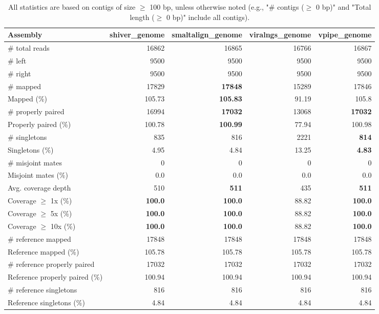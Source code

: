 \documentclass[12pt,a4paper]{article}
\begin{document}
\begin{table}[ht]
\begin{center}
\caption{All statistics are based on contigs of size $\geq$ 100 bp, unless otherwise noted (e.g., "\# contigs ($\geq$ 0 bp)" and "Total length ($\geq$ 0 bp)" include all contigs).}
\begin{tabular}{|l*{4}{|r}|}
\hline
Assembly & shiver\_genome & smaltalign\_genome & viralngs\_genome & vpipe\_genome \\ \hline
\# total reads & 16862 & 16865 & 16766 & 16867 \\ \hline
\# left & 9500 & 9500 & 9500 & 9500 \\ \hline
\# right & 9500 & 9500 & 9500 & 9500 \\ \hline
\# mapped & 17829 & {\bf 17848} & 15289 & 17846 \\ \hline
Mapped (\%) & 105.73 & {\bf 105.83} & 91.19 & 105.8 \\ \hline
\# properly paired & 16994 & {\bf 17032} & 13068 & {\bf 17032} \\ \hline
Properly paired (\%) & 100.78 & {\bf 100.99} & 77.94 & 100.98 \\ \hline
\# singletons & 835 & 816 & 2221 & {\bf 814} \\ \hline
Singletons (\%) & 4.95 & 4.84 & 13.25 & {\bf 4.83} \\ \hline
\# misjoint mates & 0 & 0 & 0 & 0 \\ \hline
Misjoint mates (\%) & 0.0 & 0.0 & 0.0 & 0.0 \\ \hline
Avg. coverage depth & 510 & {\bf 511} & 435 & {\bf 511} \\ \hline
Coverage $\geq$ 1x (\%) & {\bf 100.0} & {\bf 100.0} & 88.82 & {\bf 100.0} \\ \hline
Coverage $\geq$ 5x (\%) & {\bf 100.0} & {\bf 100.0} & 88.82 & {\bf 100.0} \\ \hline
Coverage $\geq$ 10x (\%) & {\bf 100.0} & {\bf 100.0} & 88.82 & {\bf 100.0} \\ \hline
\# reference mapped & 17848 & 17848 & 17848 & 17848 \\ \hline
Reference mapped (\%) & 105.78 & 105.78 & 105.78 & 105.78 \\ \hline
\# reference properly paired & 17032 & 17032 & 17032 & 17032 \\ \hline
Reference properly paired (\%) & 100.94 & 100.94 & 100.94 & 100.94 \\ \hline
\# reference singletons & 816 & 816 & 816 & 816 \\ \hline
Reference singletons (\%) & 4.84 & 4.84 & 4.84 & 4.84 \\ \hline

\end{tabular}
\end{center}
\end{table}
\end{document}
